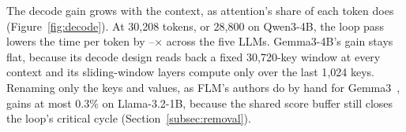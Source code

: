 \label{subsec:decode-eval}
The decode gain grows with the context, as attention's share of each token does (Figure~\ref{fig:decode}).
At 30{,}208 tokens, or 28{,}800 on Qwen3-4B, the loop pass lowers the time per token by \DecodeGainLo--\DecodeGainHi$\times$ across the five LLMs.
Gemma3-4B's gain stays flat, because its decode design reads back a fixed 30{,}720-key window at every context and its sliding-window layers compute only over the last 1{,}024 keys.
Renaming only the keys and values, as FLM's authors do by hand for Gemma3~\citep{du2026gemma3}, gains at most 0.3\% on Llama-3.2-1B, because the shared score buffer still closes the loop's critical cycle (Section~\ref{subsec:removal}).

